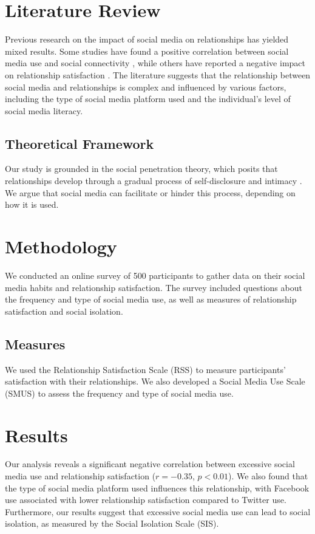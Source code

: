 \documentclass[12pt,a4paper]{article}
\begin{document}
\section{Literature Review}
Previous research on the impact of social media on relationships has yielded mixed results. Some studies have found a positive correlation between social media use and social connectivity \citep{Kirschneck2018}, while others have reported a negative impact on relationship satisfaction \citep{Kross2013}. The literature suggests that the relationship between social media and relationships is complex and influenced by various factors, including the type of social media platform used and the individual's level of social media literacy.

\subsection{Theoretical Framework}
Our study is grounded in the social penetration theory, which posits that relationships develop through a gradual process of self-disclosure and intimacy \citep{Altman1973}. We argue that social media can facilitate or hinder this process, depending on how it is used.

\section{Methodology}
We conducted an online survey of 500 participants to gather data on their social media habits and relationship satisfaction. The survey included questions about the frequency and type of social media use, as well as measures of relationship satisfaction and social isolation.

\subsection{Measures}
We used the Relationship Satisfaction Scale (RSS) to measure participants' satisfaction with their relationships. We also developed a Social Media Use Scale (SMUS) to assess the frequency and type of social media use.

\section{Results}
Our analysis reveals a significant negative correlation between excessive social media use and relationship satisfaction ($r = -0.35$, $p < 0.01$). We also found that the type of social media platform used influences this relationship, with Facebook use associated with lower relationship satisfaction compared to Twitter use. Furthermore, our results suggest that excessive social media use can lead to social isolation, as measured by the Social Isolation Scale (SIS).
\end{document}
